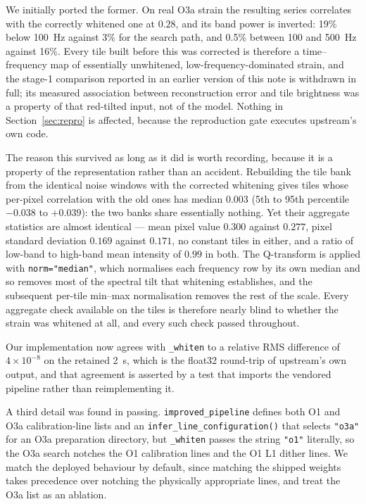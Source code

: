 \documentclass[11pt]{article}
\begin{document}
We initially ported the former. On real O3a strain the resulting series correlates with
the correctly whitened one at $0.28$, and its band power is inverted: 19\% below 100~Hz
against 3\% for the search path, and 0.5\% between 100 and 500~Hz against 16\%. Every
tile built before this was corrected is therefore a time--frequency map of essentially
unwhitened, low-frequency-dominated strain, and the stage-1 comparison reported in an
earlier version of this note is withdrawn in full; its measured association between
reconstruction error and tile brightness was a property of that red-tilted input, not of
the model. Nothing in Section~\ref{sec:repro} is affected, because the reproduction gate
executes upstream's own code.

The reason this survived as long as it did is worth recording, because it is a
property of the representation rather than an accident. Rebuilding the tile bank from
the identical noise windows with the corrected whitening gives tiles whose per-pixel
correlation with the old ones has median $0.003$ (5th to 95th percentile $-0.038$ to
$+0.039$): the two banks share essentially nothing. Yet their aggregate statistics are
almost identical --- mean pixel value $0.300$ against $0.277$, pixel standard deviation
$0.169$ against $0.171$, no constant tiles in either, and a ratio of low-band to
high-band mean intensity of $0.99$ in both. The Q-transform is applied with
\texttt{norm="median"}, which normalises each frequency row by its own median and so
removes most of the spectral tilt that whitening establishes, and the subsequent
per-tile min--max normalisation removes the rest of the scale. Every aggregate check
available on the tiles is therefore nearly blind to whether the strain was whitened at
all, and every such check passed throughout.

Our implementation now agrees with \texttt{\_whiten} to a relative RMS difference of
$4\times10^{-8}$ on the retained 2~s, which is the float32 round-trip of upstream's own
output, and that agreement is asserted by a test that imports the vendored pipeline
rather than reimplementing it.

A third detail was found in passing. \texttt{improved\_pipeline} defines both O1 and O3a
calibration-line lists and an \texttt{infer\_line\_configuration()} that selects
\texttt{"o3a"} for an O3a preparation directory, but \texttt{\_whiten} passes the string
\texttt{"o1"} literally, so the O3a search notches the O1 calibration lines and the O1
L1 dither lines. We match the deployed behaviour by default, since matching the shipped
weights takes precedence over notching the physically appropriate lines, and treat the
O3a list as an ablation.
\end{document}
